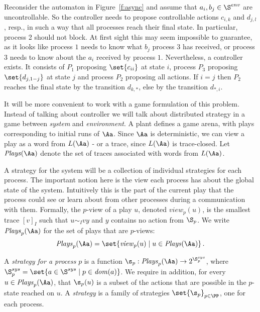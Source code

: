 \documentclass{llncs}
\newcommand{\loc}{\mathit{dom}}
\newcommand{\Plays}{\mathit{Plays}}
\newcommand{\view}{\mathit{view}}
\newcommand{\Ssys}{\S^{sys}}
\newcommand{\Senv}{\S^{env}}
\begin{document}
\begin{example}
  Reconsider the automaton in Figure~\ref{f:async} and assume that
  $a_i,b_j \in \Senv$ are uncontrollable. So the controller needs to
  propose controllable actions $c_{i,k}$ and $d_{j,l}$, resp., in such a way that all
  processes reach their final state. In particular, process 2 should
  not block. At first sight this may seem impossible to guarantee, as it
  looks like process $1$ needs to know what $b_j$ process $3$ has
  received, or process $3$ needs to know about the $a_i$ received by
  process $1$. Nevertheless, a controller exists. It consists of
  $P_1$ proposing $\set{c_{ii}}$ at state $i$, process $P_3$ proposing
  $\set{d_{j,1-j}}$ at state $j$ and process $P_2$ proposing all
  actions. If $i=j$ then $P_2$ reaches the final state by the
  transition $d_{k,*}$, else by the transition $d_{*,i}$.
\end{example}



It will be more convenient to work with a game formulation of this
problem. Instead of talking about controller we will talk about
distributed strategy in a game between \emph{system} and
\emph{environment}. A plant defines a game arena, with plays
corresponding to initial runs of $\Aa$. Since $\Aa$ is deterministic,
we can view a play as a word from $L(\Aa)$ - or a trace, since
$L(\Aa)$ is trace-closed.  Let
$\Plays(\Aa)$ denote the set of traces associated with words from
$L(\Aa)$.

A strategy for the system will be a collection of individual
strategies for each process. The important notion here is the view 
each process has about the global state of the system. Intuitively this is
the part of the current play that the process could see or  learn
about from other processes during a communication with them. Formally,
the $p$-view of a play $u$, denoted $\view_p(u)$, is the smallest
trace $[v]_I$ such that $u \sim_I vy$ and $y$ contains no action from
$\S_p$. We write $\Plays_p(\Aa)$ for the set of plays that are
$p$-views:
\[\Plays_p(\Aa)=\set{\view_p(u) \mid u\in\Plays(\Aa)}\,.
\]

A \emph{strategy for a process} $p$ is a function
$\s_p:\Plays_p(\Aa)\to 2^{\Ssys_p}$, where $\Ssys_p=\set{a \in \Ssys
\mid p\in\loc(a)}$.  We require in addition, for every $u \in
\Plays_p(\Aa)$, that $\s_p(u)$ is a subset of the actions that are
possible in the $p$-state reached on $u$. A \emph{strategy} is a
family of strategies $\set{\s_p}_{p\in \PP}$, one for each process.
\end{document}
